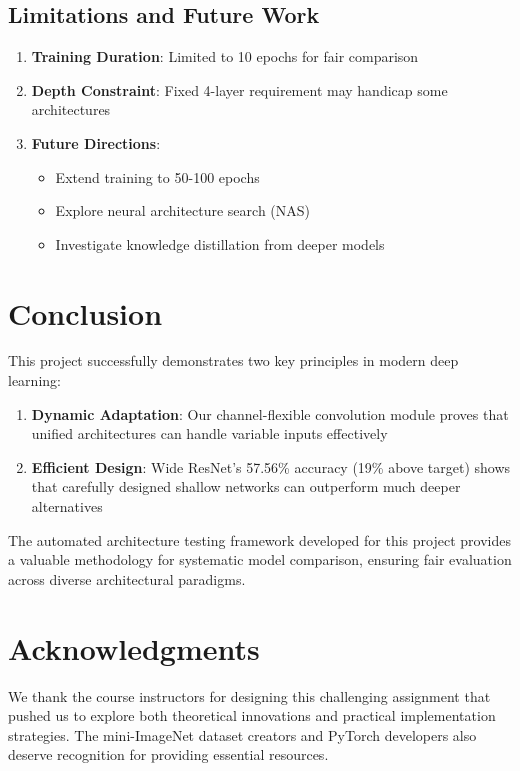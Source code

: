 \documentclass[11pt,a4paper]{article}
\begin{document}
\subsection{Limitations and Future Work}

\begin{enumerate}
    \item \textbf{Training Duration}: Limited to 10 epochs for fair comparison
    \item \textbf{Depth Constraint}: Fixed 4-layer requirement may handicap some architectures
    \item \textbf{Future Directions}:
    \begin{itemize}
        \item Extend training to 50-100 epochs
        \item Explore neural architecture search (NAS)
        \item Investigate knowledge distillation from deeper models
    \end{itemize}
\end{enumerate}

\section{Conclusion}

This project successfully demonstrates two key principles in modern deep learning:

\begin{enumerate}
    \item \textbf{Dynamic Adaptation}: Our channel-flexible convolution module proves that unified architectures can handle variable inputs effectively
    \item \textbf{Efficient Design}: Wide ResNet's 57.56\% accuracy (19\% above target) shows that carefully designed shallow networks can outperform much deeper alternatives
\end{enumerate}

The automated architecture testing framework developed for this project provides a valuable methodology for systematic model comparison, ensuring fair evaluation across diverse architectural paradigms.

\section*{Acknowledgments}

We thank the course instructors for designing this challenging assignment that pushed us to explore both theoretical innovations and practical implementation strategies. The mini-ImageNet dataset creators and PyTorch developers also deserve recognition for providing essential resources.
\end{document}
